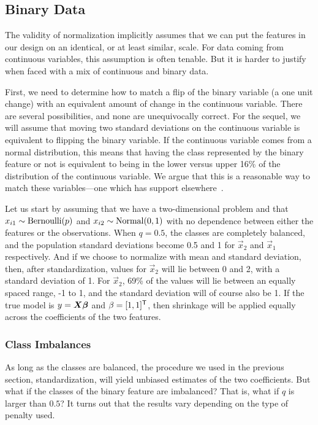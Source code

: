 \subsection{Binary Data}

The validity of normalization implicitly assumes that we can put the features in our design on an identical, or at least similar, scale. For data coming from continuous variables, this assumption is often tenable. But it is harder to justify when faced with a mix of continuous and binary data.

First, we need to determine how to match a flip of the binary variable (a one unit change) with an equivalent amount of change in the continuous variable. There are several possibilities, and none are unequivocally correct. For the sequel, we will assume that moving two standard deviations on the continuous variable is equivalent to flipping the binary variable. If the continuous variable comes from a normal distribution, this means that having the class represented by the binary feature or not is equivalent to being in the lower versus upper 16\% of the distribution of the continuous variable. We argue that this is a reasonable way to match these variables---one which has support elsewhere~\parencite{gelman2008}.

Let us start by assuming that we have a two-dimensional problem and that \(x_{i1} \sim \operatorname{Bernoulli}(p)\) and \(x_{i2} \sim \operatorname{Normal}(0, 1)\) with no dependence between either the features or the observations. When \(q = 0.5\), the classes are completely balanced, and the population standard deviations become 0.5 and 1 for \(\vec{x}_2\) and \(\vec{x}_1\) respectively. And if we choose to normalize with mean and standard deviation, then, after standardization, values for \(\vec{x}_2\) will lie between 0 and 2, with a standard deviation of 1. For \(\vec{x}_2\), 69\% of the values will lie between an equally spaced range, -1 to 1, and the standard deviation will of course also be 1. If the true model is \(y = \mat{X}\vec{\beta}\) and \(\beta = [1,1]^{\mathsf{T}}\), then shrinkage will be applied equally across the coefficients of the two features.

\subsubsection{Class Imbalances}

As long as the classes are balanced, the procedure we used in the previous section, standardization, will yield unbiased estimates of the two coefficients. But what if the classes of the binary feature are imbalanced? That is, what if \(q\) is larger than \(0.5\)? It turns out that the results vary depending on the type of penalty used.

